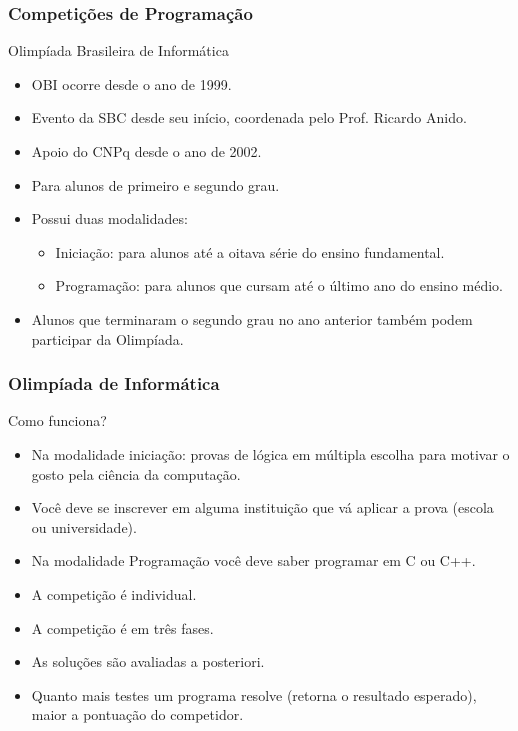 \begin{frame}
 \frametitle{Competições de Programação}
 \begin{block}{Olimpíada Brasileira de Informática}
  \begin{itemize}
   \item OBI ocorre desde o ano de 1999.
   \item Evento da SBC desde seu início, coordenada pelo Prof. Ricardo Anido.
   \item Apoio do CNPq desde o ano de 2002.\medskip
   \item Para alunos de primeiro e segundo grau.
   \item Possui duas modalidades:
    \begin{itemize}
     \item Iniciação: para alunos até a oitava série do ensino fundamental.
     \item Programação: para alunos que cursam até o último ano do ensino médio.
    \end{itemize}
   \item Alunos que terminaram o segundo grau no ano anterior também podem participar da Olimpíada.
  \end{itemize}
 \end{block}
\end{frame}
\begin{frame}
 \frametitle{Olimpíada de Informática}
 \begin{block}{Como funciona?}
  \begin{itemize}
   \item Na modalidade iniciação: provas de lógica em múltipla escolha para motivar o gosto pela ciência da computação.
   \item Você deve se inscrever em alguma instituição que vá aplicar a prova (escola ou
universidade).
   \item Na modalidade Programação você deve saber programar em C ou C++.
   \item A competição é individual.
   \item A competição é em três fases.
   \item As soluções são avaliadas a posteriori.
   \item Quanto mais testes um programa resolve (retorna o resultado esperado), maior a pontuação do competidor.
  \end{itemize}
 \end{block}
\end{frame}

